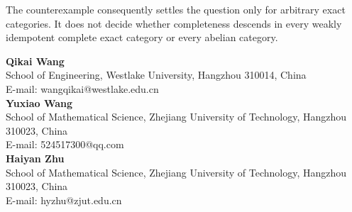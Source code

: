 \documentclass[10pt]{article}
\theoremstyle{remark}\newtheorem{remark}[theorem]{Remark}
\begin{document}
The counterexample consequently settles the question only for arbitrary exact categories.  
It does not decide whether completeness descends in every weakly idempotent complete exact category or every abelian category.




\vspace{4mm}
\small
\noindent\textbf{Qikai Wang}\\
School of Engineering, Westlake University, Hangzhou 310014, China\\
E-mail: wangqikai@westlake.edu.cn\\[1mm]
\textbf{Yuxiao Wang}\\
School of Mathematical Science, Zhejiang University of Technology, Hangzhou 310023, China\\
E-mail: 524517300@qq.com\\[1mm]
\textbf{Haiyan Zhu}\\
School of Mathematical Science, Zhejiang University of Technology, Hangzhou 310023, China\\
E-mail: hyzhu@zjut.edu.cn\\[1mm]
\end{document}
